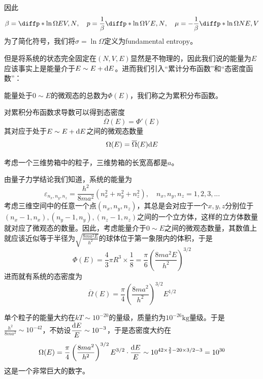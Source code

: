因此\begin{equation}
       \beta=\diffp*{\ln \Omega}{E}{{V,N}},\quad p=\frac{1}{\beta} \diffp*{\ln\Omega}{V}{{E,N}},\quad \mu =-\frac{1}{\beta} \diffp*{\ln \Omega}{N}{{E,V}}
\end{equation}
为了简化符号，我们将$\sigma=\ln \Omega$定义为fundamental entropy。

但是将系统的状态完全固定在$(N,V,E)$显然是不物理的，因此我们说的能量为$E$应该事实上是能量介于$E\sim E+\mathrm{d} E$。进而我们引入“累计分布函数”和“态密度函数”：
\begin{definition}
       能量处于$0\sim E$的微观态的总数为$\Phi (E)$，我们称之为累积分布函数。
\end{definition}
\begin{definition}
       对累积分布函数求导数可以得到态密度\begin{equation}
              \overline{\Omega}(E)=\Phi'(E)
       \end{equation}
       其对应于处于$E\sim E+\mathrm{d} E$之间的微观态数量
       \begin{equation}
              \Omega(E)=\overline{\Omega}(E)\mathrm{d} E
       \end{equation}
\end{definition}

\begin{example}
       考虑一个三维势箱中的粒子，三维势箱的长宽高都是$a$。

       由量子力学结论我们知道，系统的能量为\begin{equation}
              \varepsilon_{n_x,n_y,n_z}=\frac{h^2}{8 ma^2} (n_x^2+n_y^2+n_z^2),\quad n_x,n_y,n_z=1,2,3,...
       \end{equation}
       考虑三维空间中的任意一个点$(n_x,n_y,n_z)$，其总是会对应于一个$x,y,z$分别位于$(n_x-1,n_x),(n_y-1,n_y),(n_z-1,n_z)$之间的一个立方体，这样的立方体数量就对应了微观态的数量。因此，考虑能量介于$0\sim E$之间的微观态数量，其数值上就应该近似等于半径为$\displaystyle \sqrt{\frac{8ma^2 E}{h^2}}$的球体位于第一象限内的体积，于是\begin{equation}
              \Phi(E)=\frac{4}{3}\pi R^3 \times\frac{1}{8}=\frac{\pi}{6}\left(\frac{8ma^2 E}{h^2}\right)^{3/2}
       \end{equation}
       进而就有系统的态密度为\begin{equation}
              \overline{\Omega}(E)=\frac{\pi}{4}\left(\frac{8ma^2 }{h^2}\right)^{3/2}E^{1/2}
       \end{equation}

       单个粒子的能量大约在$kT\sim10^{-20}$的量级，质量约为$10^{-26}\mathrm{kg}$量级。于是$\displaystyle \frac{h^2}{8ma^2}\sim 10^{-42}$，不妨设$\displaystyle \frac{\mathrm{d} E}{E}\sim 10^{-3}$，于是态密度大约在\begin{equation}
              \Omega(E)=\frac{\pi}{4}\left(\frac{8ma^2 }{h^2}\right)^{3/2}E^{3/2}\cdot \frac{\mathrm{d} E}{E}\sim 10^{42\times \frac{3}{2}-20\times 3/2- 3} =10^{30}
       \end{equation}
       这是一个非常巨大的数字。
\end{example}

